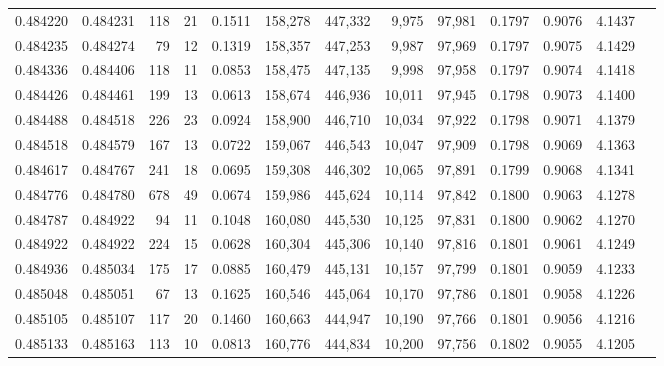 \begin{tabular}{rrrrrrrrrrrrr}
0.484220 & 0.484231 &   118 &    21 &                                     0.1511 & 158,278 & 447,332 &   9,975 &  97,981 & 0.1797 & 0.9076 & 4.1437 \\
0.484235 & 0.484274 &    79 &    12 &                                     0.1319 & 158,357 & 447,253 &   9,987 &  97,969 & 0.1797 & 0.9075 & 4.1429 \\
0.484336 & 0.484406 &   118 &    11 &                                     0.0853 & 158,475 & 447,135 &   9,998 &  97,958 & 0.1797 & 0.9074 & 4.1418 \\
0.484426 & 0.484461 &   199 &    13 &                                     0.0613 & 158,674 & 446,936 &  10,011 &  97,945 & 0.1798 & 0.9073 & 4.1400 \\
0.484488 & 0.484518 &   226 &    23 &                                     0.0924 & 158,900 & 446,710 &  10,034 &  97,922 & 0.1798 & 0.9071 & 4.1379 \\
0.484518 & 0.484579 &   167 &    13 &                                     0.0722 & 159,067 & 446,543 &  10,047 &  97,909 & 0.1798 & 0.9069 & 4.1363 \\
0.484617 & 0.484767 &   241 &    18 &                                     0.0695 & 159,308 & 446,302 &  10,065 &  97,891 & 0.1799 & 0.9068 & 4.1341 \\
0.484776 & 0.484780 &   678 &    49 &                                     0.0674 & 159,986 & 445,624 &  10,114 &  97,842 & 0.1800 & 0.9063 & 4.1278 \\
0.484787 & 0.484922 &    94 &    11 &                                     0.1048 & 160,080 & 445,530 &  10,125 &  97,831 & 0.1800 & 0.9062 & 4.1270 \\
0.484922 & 0.484922 &   224 &    15 &                                     0.0628 & 160,304 & 445,306 &  10,140 &  97,816 & 0.1801 & 0.9061 & 4.1249 \\
0.484936 & 0.485034 &   175 &    17 &                                     0.0885 & 160,479 & 445,131 &  10,157 &  97,799 & 0.1801 & 0.9059 & 4.1233 \\
0.485048 & 0.485051 &    67 &    13 &                                     0.1625 & 160,546 & 445,064 &  10,170 &  97,786 & 0.1801 & 0.9058 & 4.1226 \\
0.485105 & 0.485107 &   117 &    20 &                                     0.1460 & 160,663 & 444,947 &  10,190 &  97,766 & 0.1801 & 0.9056 & 4.1216 \\
0.485133 & 0.485163 &   113 &    10 &                                     0.0813 & 160,776 & 444,834 &  10,200 &  97,756 & 0.1802 & 0.9055 & 4.1205 \\

\end{tabular}
